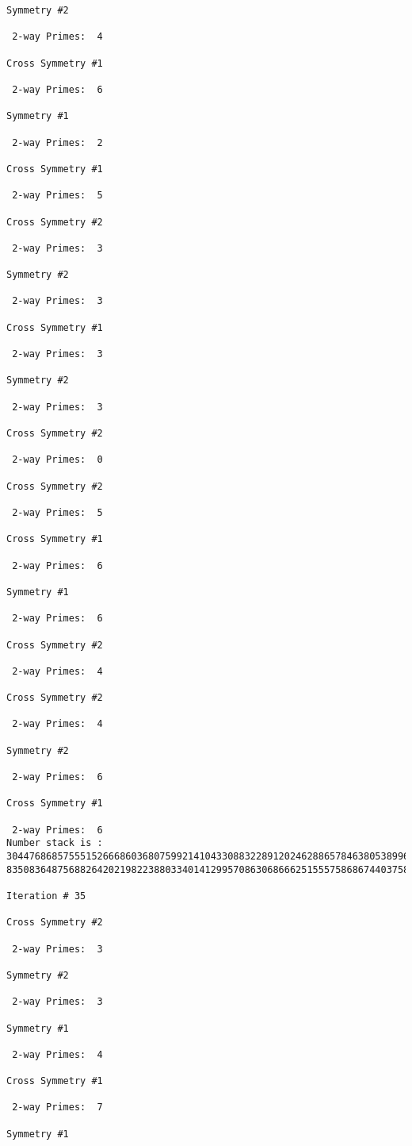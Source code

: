 {{{{\begin{verbatim}
Symmetry #2

 2-way Primes: 	4

Cross Symmetry #1

 2-way Primes: 	6

Symmetry #1

 2-way Primes: 	2

Cross Symmetry #1

 2-way Primes: 	5

Cross Symmetry #2

 2-way Primes: 	3

Symmetry #2

 2-way Primes: 	3

Cross Symmetry #1

 2-way Primes: 	3

Symmetry #2

 2-way Primes: 	3

Cross Symmetry #2

 2-way Primes: 	0

Cross Symmetry #2

 2-way Primes: 	5

Cross Symmetry #1

 2-way Primes: 	6

Symmetry #1

 2-way Primes: 	6

Cross Symmetry #2

 2-way Primes: 	4

Cross Symmetry #2

 2-way Primes: 	4

Symmetry #2

 2-way Primes: 	6

Cross Symmetry #1

 2-way Primes: 	6
Number stack is :
30447686857555152666860368075992141043308832289120246288657846380538996794608835958544046240163340857
83508364875688264202198223880334014129957086306866625155575868674403758043361042640445859538806497699

Iteration #	35

Cross Symmetry #2

 2-way Primes: 	3

Symmetry #2

 2-way Primes: 	3

Symmetry #1

 2-way Primes: 	4

Cross Symmetry #1

 2-way Primes: 	7

Symmetry #1


\end{verbatim}}}}}
